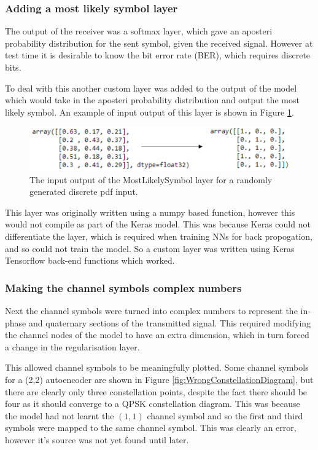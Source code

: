 \documentclass[12pt,onecolumn,letterpaper]{article}
\begin{document}
\subsubsection{Adding a most likely symbol layer}

The output of the receiver was a softmax layer, which gave an aposteri probability distribution for the sent symbol, given the received signal. However at test time it is desirable to know the bit error rate (BER), which requires discrete bits.

To deal with this another custom layer was added to the output of the model which would take in the aposteri probability distribution and output the most likely symbol. An example of input output of this layer is shown in Figure \ref{fig:MostLikelySymbolLayer}.

\begin{figure}[t]
   \centering
   \includegraphics[width=0.8\linewidth]{figures/most_likely_symbol_io.PNG}
   \caption{The input output of the MostLikelySymbol layer for a randomly generated discrete pdf input. }
\label{fig:MostLikelySymbolLayer}
\end{figure}

This layer was originally written using a numpy based function, however this would not compile as part of the Keras model. This was because Keras could not differentiate the layer, which is required when training NNs for back propogation, and so could not train the model. So a custom layer was written using Keras Tensorflow back-end functions which worked.

\subsubsection{Making the channel symbols complex numbers}

Next the channel symbols were turned into complex numbers to represent the in-phase and quaternary sections of the transmitted signal. This required modifying the channel nodes of the model to have an extra dimension, which in turn forced a change in the regularisation layer.

This allowed channel symbols to be meaningfully plotted. Some channel symbols for a (2,2) autoencoder are shown in Figure \ref{fig:WrongConstellationDiagram}, but there are clearly only three constellation points, despite the fact there should be four as it should converge to a QPSK constellation diagram. This was because the model had not learnt the $(1,1)$ channel symbol and so the first and third symbols were mapped to the same channel symbol. This was clearly an error, however it's source was not yet found until later. 
\end{document}
